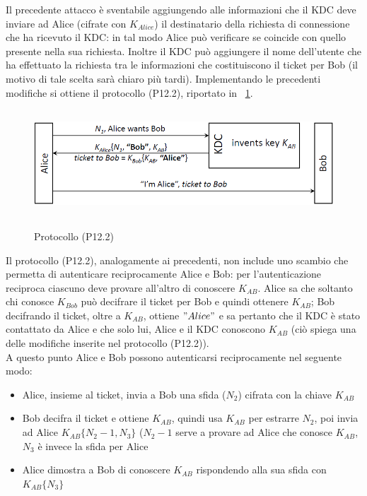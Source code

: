 Il precedente attacco è sventabile aggiungendo alle informazioni che il KDC deve inviare ad Alice (cifrate con $K_{Alice}$) il destinatario della richiesta di connessione che ha ricevuto il KDC: in tal modo Alice può verificare se coincide con quello presente nella sua richiesta. Inoltre il KDC può aggiungere il nome dell'utente che ha effettuato la richiesta tra le informazioni che costituiscono il ticket per Bob (il motivo di tale scelta sarà chiaro più tardi).
Implementando le precedenti modifiche si ottiene il protocollo (P12.2), riportato in \figurename~\ref{fig:ImgS106bis}.
\begin{figure}[htbp]
	\centering%
	\subfigure%
	{\includegraphics[height=4cm, width=12cm, keepaspectratio]{Immagini/autenticazione/ImgS106bis.png}}
	\caption{Protocollo (P12.2)}\label{fig:ImgS106bis} 	
\end{figure}
Il protocollo (P12.2), analogamente ai precedenti, non include uno scambio che permetta di autenticare reciprocamente Alice e Bob: per l'autenticazione reciproca ciascuno deve provare all'altro di conoscere $K_{AB}$. Alice sa che soltanto chi conosce $K_{Bob}$ può decifrare il ticket per Bob e quindi ottenere $K_{AB}$; Bob decifrando il ticket, oltre a $K_{AB}$, ottiene $"Alice"$ e sa pertanto che il KDC è stato contattato da Alice e che solo lui,
Alice e il KDC conoscono $K_{AB}$ (ciò spiega una delle modifiche inserite nel protocollo (P12.2)).\\
A questo punto Alice e Bob possono autenticarsi reciprocamente nel seguente modo:
\begin{itemize}
	\item Alice, insieme al ticket, invia a Bob una sfida ($N_{2}$) cifrata con la chiave $K_{AB}$
	\item Bob decifra il ticket e ottiene $K_{AB}$, quindi usa $K_{AB}$ per estrarre $N_{2}$, poi invia ad Alice $K_{AB}\lbrace N_{2}-1, N_{3}\rbrace$ ($N_{2}-1$ serve a provare ad Alice che conosce $K_{AB}$, $N_{3}$ è invece la sfida per Alice
	\item Alice dimostra a Bob di conoscere $K_{AB}$ rispondendo alla sua sfida con $K_{AB}\lbrace N_{3}\rbrace$
\end{itemize}
